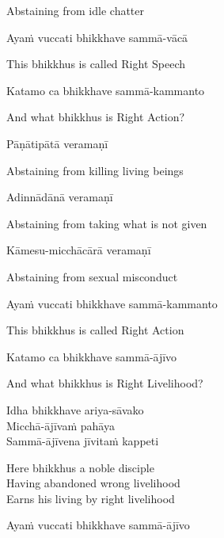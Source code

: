 \begin{cprenglish}
Abstaining from idle chatter
\end{cprenglish}

Ayaṁ vuccati bhikkhave sammā-vācā

\begin{cprenglish}
This bhikkhus is called Right Speech
\end{cprenglish}

Katamo ca bhikkhave sammā-kammanto

\begin{cprenglish}
And what bhikkhus is Right Action?
\end{cprenglish}

Pāṇātipātā veramaṇī

\begin{cprenglish}
Abstaining from killing living beings
\end{cprenglish}

Adinnādānā veramaṇī

\begin{cprenglish}
Abstaining from taking what is not given
\end{cprenglish}

Kāmesu-micchācārā veramaṇī

\begin{cprenglish}
Abstaining from sexual misconduct
\end{cprenglish}

Ayaṁ vuccati bhikkhave sammā-kammanto

\begin{cprenglish}
This bhikkhus is called Right Action
\end{cprenglish}

Katamo ca bhikkhave sammā-ājīvo

\begin{cprenglish}
And what bhikkhus is Right Livelihood?
\end{cprenglish}

Idha bhikkhave ariya-sāvako\\
Micchā-ājīvaṁ pahāya\\
Sammā-ājīvena jīvitaṁ kappeti

\begin{cprenglish}
Here bhikkhus a noble disciple\\
Having abandoned wrong livelihood\\
Earns his living by right livelihood
\end{cprenglish}

Ayaṁ vuccati bhikkhave sammā-ājīvo

